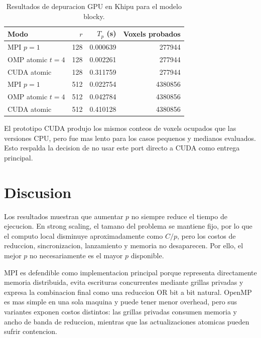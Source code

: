 \documentclass[conference]{IEEEtran}
\begin{document}
\begin{table}[t]
    \centering
    \caption{Resultados de depuracion GPU en Khipu para el modelo blocky.}
    \begin{tabular}{lrrr}
        \toprule
        Modo & $r$ & $T_p$ (s) & Voxels probados \\
        \midrule
        MPI $p=1$ & 128 & 0.000639 & 277944 \\
        OMP atomic $t=4$ & 128 & 0.002261 & 277944 \\
        CUDA atomic & 128 & 0.311759 & 277944 \\
        MPI $p=1$ & 512 & 0.022754 & 4380856 \\
        OMP atomic $t=4$ & 512 & 0.042784 & 4380856 \\
        CUDA atomic & 512 & 0.410128 & 4380856 \\
        \bottomrule
    \end{tabular}
\end{table}

El prototipo CUDA produjo los mismos conteos de voxels ocupados que las versiones
CPU, pero fue mas lento para los casos pequenos y medianos evaluados. Esto
respalda la decision de no usar este port directo a CUDA como entrega principal.

\section{Discusion}

Los resultados muestran que aumentar $p$ no siempre reduce el tiempo de
ejecucion. En strong scaling, el tamano del problema se mantiene fijo, por lo
que el computo local disminuye aproximadamente como $C/p$, pero los costos de
reduccion, sincronizacion, lanzamiento y memoria no desaparecen. Por ello, el
mejor $p$ no necesariamente es el mayor $p$ disponible.

MPI es defendible como implementacion principal porque representa directamente
memoria distribuida, evita escrituras concurrentes mediante grillas privadas y
expresa la combinacion final como una reduccion OR bit a bit natural. OpenMP es
mas simple en una sola maquina y puede tener menor overhead, pero sus variantes
exponen costos distintos: las grillas privadas consumen memoria y ancho de banda
de reduccion, mientras que las actualizaciones atomicas pueden sufrir contencion.
\end{document}
